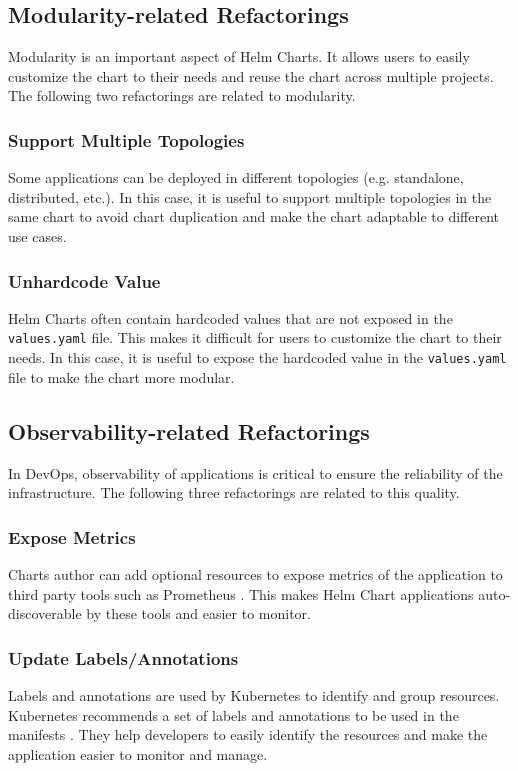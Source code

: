 \documentclass[conference]{IEEEtran}
\begin{document}
\subsection{Modularity-related Refactorings}

Modularity is an important aspect of Helm Charts. It allows users to easily customize the chart to their needs and reuse the chart across multiple projects. The following two refactorings are related to modularity.

\subsubsection{Support Multiple Topologies}
Some applications can be deployed in different topologies (e.g. standalone, distributed, etc.). In this case, it is useful to support multiple topologies in the same chart to avoid chart duplication and make the chart adaptable to different use cases.

\subsubsection{Unhardcode Value}
Helm Charts often contain hardcoded values that are not exposed in the \texttt{values.yaml} file. This makes it difficult for users to customize the chart to their needs. In this case, it is useful to expose the hardcoded value in the \texttt{values.yaml} file to make the chart more modular.

\subsection{Observability-related Refactorings}

In DevOps, observability of applications is critical to ensure the reliability of the infrastructure. The following three refactorings are related to this quality.

\subsubsection{Expose Metrics}
Charts author can add optional resources to expose metrics of the application to third party tools such as Prometheus \cite{prom}. This makes Helm Chart applications auto-discoverable by these tools and easier to monitor.

\subsubsection{Update Labels/Annotations}
Labels and annotations are used by Kubernetes to identify and group resources. Kubernetes recommends a set of labels and annotations to be used in the manifests \cite{reclabels}. They help developers to easily identify the resources and make the application easier to monitor and manage.
\end{document}
